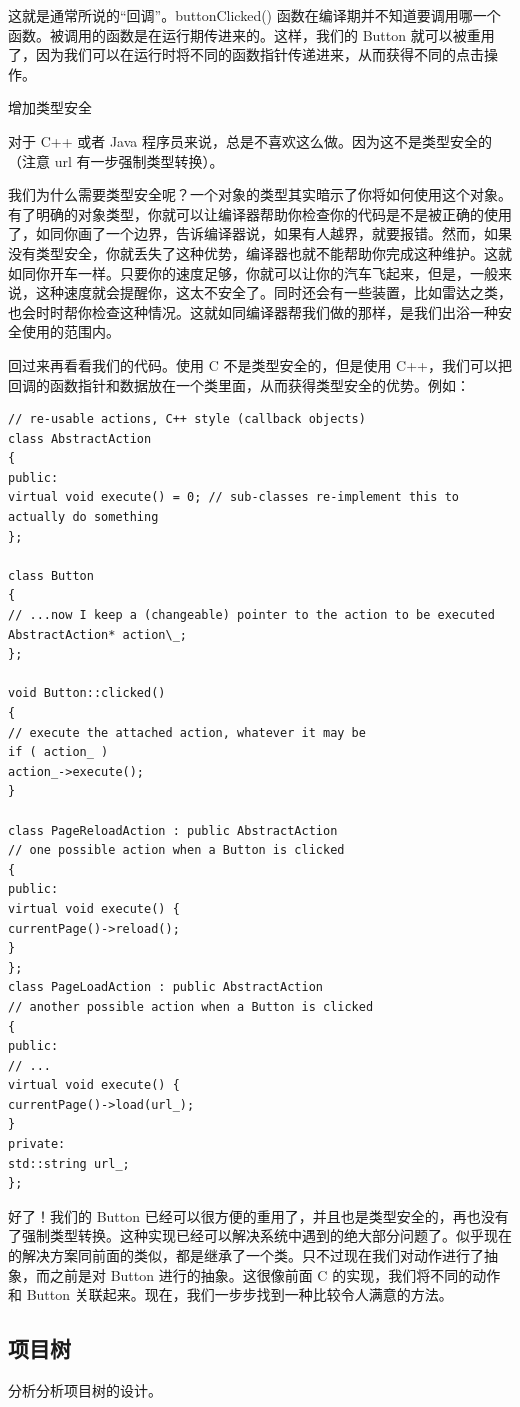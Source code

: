 这就是通常所说的“回调”。buttonClicked() 函数在编译期并不知道要调用哪一个函数。被调用的函数是在运行期传进来的。这样，我们的 Button 就可以被重用了，因为我们可以在运行时将不同的函数指针传递进来，从而获得不同的点击操作。

增加类型安全

对于 C++ 或者 Java 程序员来说，总是不喜欢这么做。因为这不是类型安全的（注意 url 有一步强制类型转换）。

我们为什么需要类型安全呢？一个对象的类型其实暗示了你将如何使用这个对象。有了明确的对象类型，你就可以让编译器帮助你检查你的代码是不是被正确的使用了，如同你画了一个边界，告诉编译器说，如果有人越界，就要报错。然而，如果没有类型安全，你就丢失了这种优势，编译器也就不能帮助你完成这种维护。这就如同你开车一样。只要你的速度足够，你就可以让你的汽车飞起来，但是，一般来说，这种速度就会提醒你，这太不安全了。同时还会有一些装置，比如雷达之类，也会时时帮你检查这种情况。这就如同编译器帮我们做的那样，是我们出浴一种安全使用的范围内。

回过来再看看我们的代码。使用 C 不是类型安全的，但是使用 C++，我们可以把回调的函数指针和数据放在一个类里面，从而获得类型安全的优势。例如：


\begin{lstlisting}
// re-usable actions, C++ style (callback objects)
class AbstractAction
{
public:
virtual void execute() = 0; // sub-classes re-implement this to actually do something
};

class Button
{
// ...now I keep a (changeable) pointer to the action to be executed
AbstractAction* action\_;
};

void Button::clicked()
{
// execute the attached action, whatever it may be
if ( action_ )
action_->execute();
}

class PageReloadAction : public AbstractAction
// one possible action when a Button is clicked
{
public:
virtual void execute() {
currentPage()->reload();
}
};
class PageLoadAction : public AbstractAction
// another possible action when a Button is clicked
{
public:
// ...
virtual void execute() {
currentPage()->load(url_);
}
private:
std::string url_;
};
\end{lstlisting}
好了！我们的 Button 已经可以很方便的重用了，并且也是类型安全的，再也没有了强制类型转换。这种实现已经可以解决系统中遇到的绝大部分问题了。似乎现在的解决方案同前面的类似，都是继承了一个类。只不过现在我们对动作进行了抽象，而之前是对 Button 进行的抽象。这很像前面 C 的实现，我们将不同的动作和 Button 关联起来。现在，我们一步步找到一种比较令人满意的方法。
\subsection{项目树}
分析分析项目树的设计。

